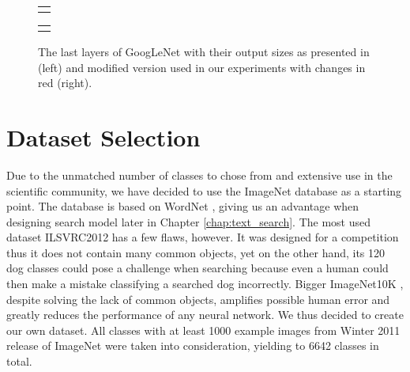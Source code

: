 \begin{figure}
	\centering
	
	\begin{tabular}{@{}c@{}}
		\subfloat{
			
		}
	\end{tabular}
	\begin{tabular}{@{}c@{}}
		\subfloat{
			
		}
	\end{tabular}
	
	\caption[The last layers of GoogLeNet]{The last layers of GoogLeNet with their output sizes as presented in \cite{szegedy2015going} (left) and modified version used in our experiments with changes in red (right).}
	\label{fig:inception_end}
\end{figure}



\section{Dataset Selection}\label{sec:dataset_selection}
Due to the unmatched number of classes to chose from and extensive use in the scientific community, we have decided to use the ImageNet database \cite{ILSVRC15} as a starting point. The database is based on WordNet \cite{WordNet}, giving us an advantage when designing search model later in Chapter \ref{chap:text_search}. The most used dataset ILSVRC2012 has a few flaws, however. It was designed for a competition thus it does not contain many common objects, yet on the other hand, its 120 dog classes could pose a challenge when searching because even a human could then make a mistake classifying a searched dog incorrectly. Bigger ImageNet10K \cite{deng2010does}, despite solving the lack of common objects, amplifies possible human error and greatly reduces the performance of any neural network. We thus decided to create our own dataset. All classes with at least 1000 example images from Winter 2011 release of ImageNet were taken into consideration, yielding to 6642 classes in total.

